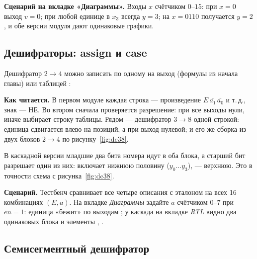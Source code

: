 
\textbf{Сценарий на вкладке «Диаграммы».} Входы $x$ счётчиком $0$--$15$:
при $x=0$ выход $v=0$; при любой единице в $x_3$ всегда $y=3$; на
$x=0110$ получается $y=2$, и обе версии модуля дают одинаковые графики.

\subsection{Дешифраторы: assign и case}

Дешифратор $2\to4$ можно записать по одному  на выход
(формулы из начала главы) или таблицей :



\textbf{Как читается.} В первом модуле каждая строка --- произведение
$E\,\overline{a_1}\,\overline{a_0}$ и т.\,д., знак \code{\textasciitilde} --- НЕ.
Во втором сначала проверяется разрешение: при  все выходы нули,
иначе  выбирает строку таблицы. Рядом ---
дешифратор $3\to8$ одной строкой: единица сдвигается влево на 
позиций, а при  выход нулевой; и его же сборка из двух блоков
$2\to4$ по рисунку~\ref{fig:dc38}.



В каскадной версии младшие два бита номера идут в оба блока, а старший
бит разрешает один из них:  включает нижнюю
половину ($y_0\ldots y_3$),  --- верхнюю. Это в точности
схема с рисунка~\ref{fig:dc38}.

\textbf{Сценарий.} Тестбенч  сравнивает все четыре
описания с эталоном на всех 16 комбинациях $(E,a)$. На вкладке
\emph{Диаграммы} задайте $a$ счётчиком $0$--$7$ при $en=1$: единица
«бежит» по выходам ; у каскада на вкладке \emph{RTL} видно
два одинаковых блока и элементы \code{\&}, \code{\textasciitilde}.

\subsection{Семисегментный дешифратор}

